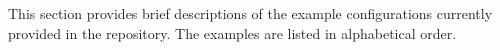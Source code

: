 This section provides brief descriptions of the example configurations currently provided in the \apsq repository.
The examples are listed in alphabetical order.
